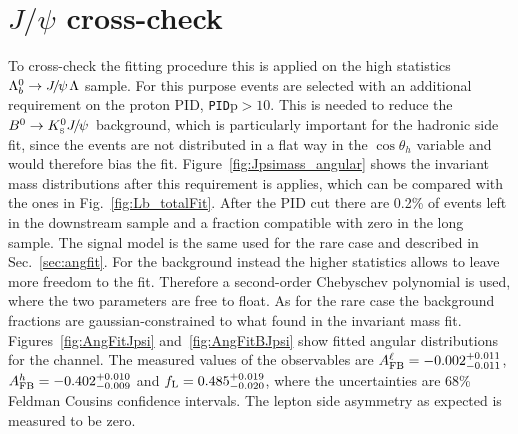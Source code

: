 



\section{$J/\psi$ cross-check}

To cross-check the fitting procedure this is applied on the high statistics $\Lb\to\jpsi\Lz$ sample.
For this purpose events are selected with an additional requirement on the proton PID, \verb!PID!p$ > 10$.
This is needed to reduce the $\Bz\to\KS\jpsi$ background, which is particularly important for the hadronic side fit, 
since the \KS events are not distributed in a flat way in the $\cos\theta_h$ variable and would therefore bias the fit.
Figure~\ref{fig:Jpsimass_angular} shows the invariant mass distributions after this requirement is applies, which 
can be compared with the ones in Fig.~\ref{fig:Lb_totalFit}. %
After the PID cut there are 0.2\% of \KS events left in the downstream sample and a fraction
compatible with zero in the long sample.
The signal model is the same used for the rare case and described in Sec.~\ref{sec:angfit}.
For the background instead the higher statistics allows to leave more freedom to the fit.
Therefore a second-order Chebyschev polynomial is used, where the two parameters are
free to float. As for the rare case the background fractions are gaussian-constrained
to what found in the invariant mass fit. Figures~\ref{fig:AngFitJpsi} and~\ref{fig:AngFitBJpsi} show
fitted angular distributions for the \jpsi channel. The measured values of the observables
are $A_{\rm FB}^\ell = -0.002^{+0.011}_{-0.011}$, $A_{\rm FB}^h = -0.402^{+0.010}_{-0.009}$
and $f_{\rm L} = 0.485^{+0.019}_{-0.020}$, where the uncertainties are 68\% Feldman Cousins 
confidence intervals. The lepton side asymmetry as expected is measured to be zero.

